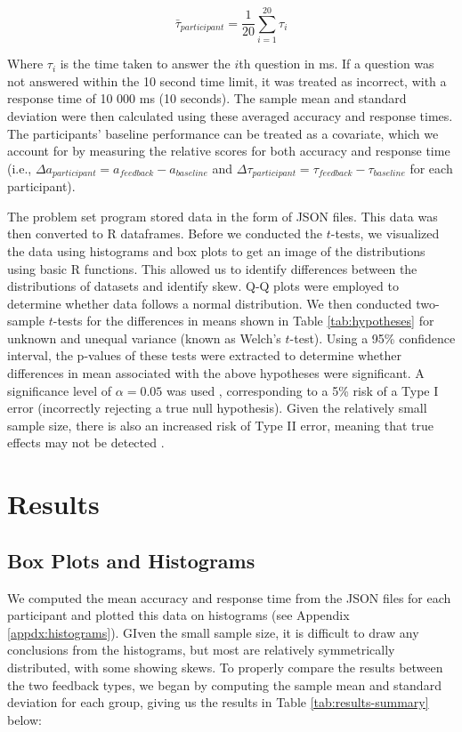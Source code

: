 \documentclass[12pt]{exam}
\begin{document}
\begin{equation}
    \label{eq:participant-response-time}
    \bar{\tau}_{participant} = \frac{1}{20} \sum_{i=1}^{20}\tau_i
\end{equation}

Where $\tau_i$ is the time taken to answer the $i$th question in ms. If a question was not answered within the 10 second time limit, it was treated as incorrect, with a response time of 10 000 ms (10 seconds). The sample mean and standard deviation were then calculated using these averaged accuracy and response times. The participants’ baseline performance can be treated as a covariate, which we account for by measuring the relative scores for both accuracy and response time (i.e., $\Delta a_{participant}= a_{feedback} - a_{baseline}$ and  $\Delta \tau_{participant}=\tau_{feedback}-\tau_{baseline}$ for each participant).\newline

The problem set program stored data in the form of JSON files. This data was then converted to R dataframes. Before we conducted the $t$-tests, we visualized the data using histograms and box plots to get an image of the distributions using basic R functions. This allowed us to identify differences between the distributions of datasets and identify skew. Q-Q plots were employed to determine whether data follows a normal distribution. We then conducted two-sample $t$-tests for the differences in means shown in Table \ref{tab:hypotheses} for unknown and unequal variance (known as Welch’s $t$-test). Using a 95\% confidence interval, the p-values of these tests were extracted to determine whether differences in mean associated with the above hypotheses were significant. A significance level of $\alpha = 0.05$ was used \cite{p-0.05}, corresponding to a 5\% risk of a Type I error \cite{lin2018bias} (incorrectly rejecting a true null hypothesis). Given the relatively small sample size, there is also an increased risk of Type II error, meaning that true effects may not be detected \cite{sample-size-effect}.

\section{Results}
\subsection{Box Plots and Histograms}
We computed the mean accuracy and response time from the JSON files for each participant and plotted this data on histograms (see Appendix \ref{appdx:histograms}). GIven the small sample size, it is difficult to draw any conclusions from the histograms, but most are relatively symmetrically distributed, with some showing skews. To properly compare the results between the two feedback types, we began by computing the sample mean and standard deviation for each group, giving us the results in Table \ref{tab:results-summary} below: 
\end{document}
